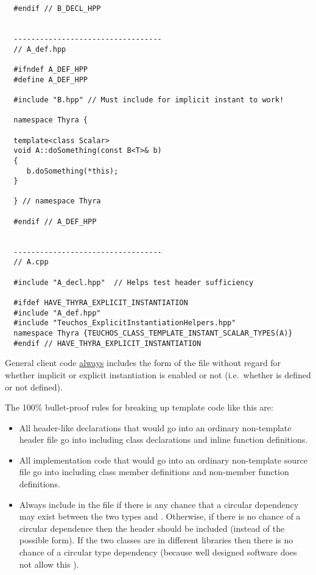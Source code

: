 \begin{itemize}
{\begin{verbatim}
  #endif // B_DECL_HPP


  ----------------------------------
  // A_def.hpp

  #ifndef A_DEF_HPP
  #define A_DEF_HPP

  #include "B.hpp" // Must include for implicit instant to work!

  namespace Thyra {

  template<class Scalar>
  void A::doSomething(const B<T>& b)
  {
     b.doSomething(*this);
  }

  } // namespace Thyra

  #endif // A_DEF_HPP


  ----------------------------------
  // A.cpp

  #include "A_decl.hpp"  // Helps test header sufficiency

  #ifdef HAVE_THYRA_EXPLICIT_INSTANTIATION
  #include "A_def.hpp"
  #include "Teuchos_ExplicitInstantiationHelpers.hpp"
  namespace Thyra {TEUCHOS_CLASS_TEMPLATE_INSTANT_SCALAR_TYPES(A)}
  #endif // HAVE_THYRA_EXPLICIT_INSTANTIATION
\end{verbatim}}


General client code {}\underline{always} includes the {} form of
the file without regard for whether implicit or explicit instantiation is
enabled or not (i.e.\ whether {} is
defined or not defined).

The 100\% bullet-proof rules for breaking up template code like this are:

\begin{itemize}

{}\item All header-like declarations that would go into an ordinary
non-template {} header file go into {}
including class declarations and inline function definitions.

{}\item All implementation code that would go into an ordinary non-template
{} source file go into {} including class
member definitions and non-member function definitions.

{}\item Always include {} in the
{} file if there is any chance that a
circular dependency may exist between the two types
{} and {}.  Otherwise, if there is
no chance of a circular dependence then the header
{} should be included (instead of the
possible {} form).  If the two classes are in
different libraries then there is no chance of a circular type
dependency (because well designed software does not allow this
{}\cite{AgileSoftwareDevelopment}).


\end{itemize}
\end{itemize}

